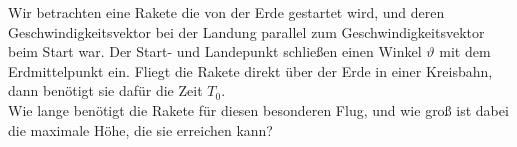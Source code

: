 \begin{Exercise}[label = cmparallel, difficulty = 3, origin = P. Gnädig, title = Parallellandung]
	Wir betrachten eine Rakete die von der Erde gestartet wird, und deren Geschwindigkeitsvektor bei der Landung parallel zum Geschwindigkeitsvektor beim Start war. Der Start- und Landepunkt schließen einen Winkel $\vartheta$ mit dem Erdmittelpunkt ein. Fliegt die Rakete direkt über der Erde in einer Kreisbahn, dann benötigt sie dafür die Zeit $T_0$. \\
	Wie lange benötigt die Rakete für diesen besonderen Flug, und wie groß ist dabei die maximale Höhe, die sie erreichen kann?
\end{Exercise}